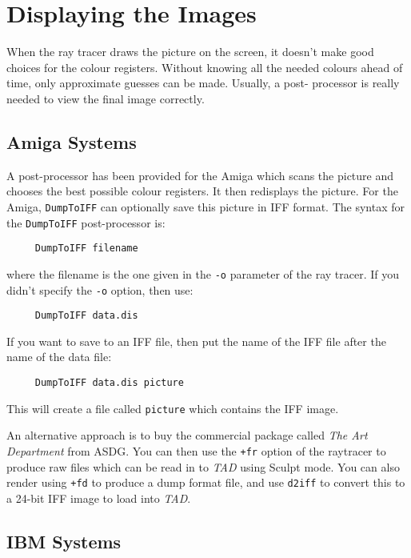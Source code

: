 \chapter{Displaying the Images}

When the ray tracer draws the picture on the screen, it doesn't make good
choices for the colour registers.  Without knowing all the needed colours
ahead of time, only approximate guesses can be made.  Usually, a post-
processor is really needed to view the final image correctly.

\section{Amiga Systems}

A post-processor has been provided for the Amiga which scans the picture and
chooses the best possible colour registers.  It then redisplays the picture.
For the Amiga, {\tt DumpToIFF}
can optionally save this picture in IFF format. The syntax for the
{\tt DumpToIFF} post-processor is:
\begin{verbatim}
     DumpToIFF filename
\end{verbatim}
where the filename is the one given in the {\tt -o}
parameter of the ray tracer.  If you didn't specify the {\tt -o}
option, then use:
\begin{verbatim}
     DumpToIFF data.dis
\end{verbatim}
If you want to save to an IFF file, then put the name of the IFF file after
the name of the data file:
\begin{verbatim}
     DumpToIFF data.dis picture
\end{verbatim}
This will create a file called {\tt picture} which contains the IFF image.

An alternative approach is to buy the commercial package called
{\em The Art Department} from ASDG.
You can then use the {\tt +fr} option
of the raytracer to produce raw files which can be read in to {\em TAD}
using Sculpt mode.  You can also render using {\tt +fd} to produce a
dump format file, and use {\tt d2iff} to convert this
to a 24-bit IFF image to load into {\em TAD}.

\section{IBM Systems}

